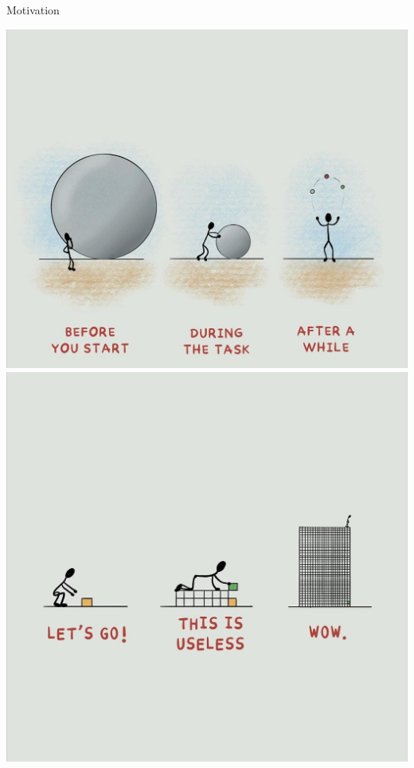 \documentclass[
  8pt,
  ignorenonframetext,
]{beamer}
\begin{document}
\begin{frame}{Motivation}
\protect\hypertarget{motivation}{}
\begin{center}\includegraphics[width=0.45\linewidth]{../Abbildungen/mot_2} \includegraphics[width=0.45\linewidth]{../Abbildungen/mot_1} \end{center}
\end{frame}
\end{document}
